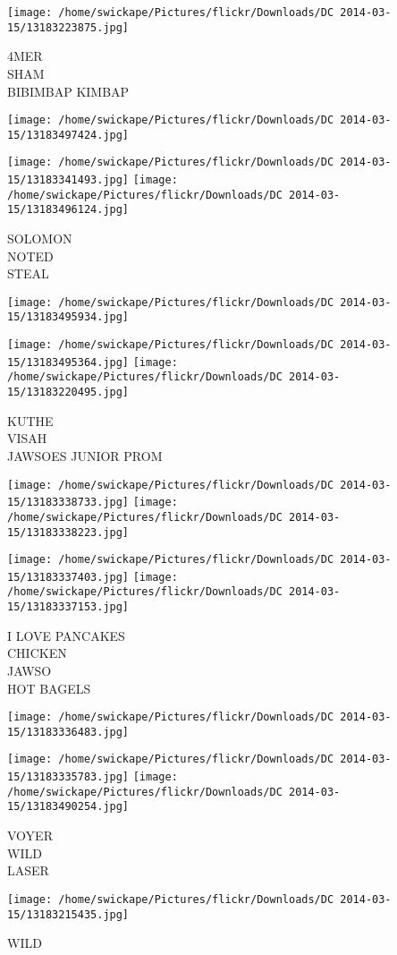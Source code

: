 \documentclass[10pt,letterpaper]{article}
\begin{document}
\texttt{[image: /home/swickape/Pictures/flickr/Downloads/DC 2014-03-15/13183223875.jpg]}

4MER\\
SHAM\\
BIBIMBAP KIMBAP
\pagebreak

\texttt{[image: /home/swickape/Pictures/flickr/Downloads/DC 2014-03-15/13183497424.jpg]}

\vspace{0.25in}
\texttt{[image: /home/swickape/Pictures/flickr/Downloads/DC 2014-03-15/13183341493.jpg]}
\texttt{[image: /home/swickape/Pictures/flickr/Downloads/DC 2014-03-15/13183496124.jpg]}

SOLOMON\\
NOTED\\
STEAL
\pagebreak

\texttt{[image: /home/swickape/Pictures/flickr/Downloads/DC 2014-03-15/13183495934.jpg]}

\vspace{0.25in}
\texttt{[image: /home/swickape/Pictures/flickr/Downloads/DC 2014-03-15/13183495364.jpg]}
\texttt{[image: /home/swickape/Pictures/flickr/Downloads/DC 2014-03-15/13183220495.jpg]}

KUTHE\\
VISAH\\
JAWSOES JUNIOR PROM
\pagebreak

\texttt{[image: /home/swickape/Pictures/flickr/Downloads/DC 2014-03-15/13183338733.jpg]}
\texttt{[image: /home/swickape/Pictures/flickr/Downloads/DC 2014-03-15/13183338223.jpg]}

\texttt{[image: /home/swickape/Pictures/flickr/Downloads/DC 2014-03-15/13183337403.jpg]}
\texttt{[image: /home/swickape/Pictures/flickr/Downloads/DC 2014-03-15/13183337153.jpg]}

I LOVE PANCAKES\\
CHICKEN\\
JAWSO\\
HOT BAGELS
\pagebreak

\texttt{[image: /home/swickape/Pictures/flickr/Downloads/DC 2014-03-15/13183336483.jpg]}

\vspace{0.25in}
\texttt{[image: /home/swickape/Pictures/flickr/Downloads/DC 2014-03-15/13183335783.jpg]}
\texttt{[image: /home/swickape/Pictures/flickr/Downloads/DC 2014-03-15/13183490254.jpg]}

VOYER\\
WILD\\
LASER
\pagebreak

\texttt{[image: /home/swickape/Pictures/flickr/Downloads/DC 2014-03-15/13183215435.jpg]}

WILD
\pagebreak
\end{document}
